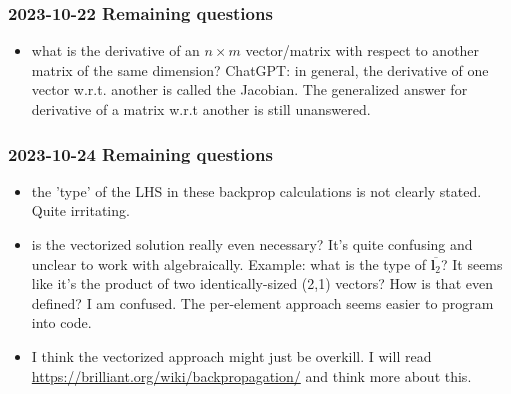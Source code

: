 \documentclass{article}
\begin{document}
\subsubsection{2023-10-22 Remaining questions}
\begin{itemize}
    \item what is the derivative of an $n \times m$ vector/matrix with respect to another matrix of the same dimension? 
    ChatGPT: in general, the derivative of one vector w.r.t. another is called the Jacobian.
    The generalized answer for derivative of a matrix w.r.t another is still unanswered.
\end{itemize}
\subsubsection{2023-10-24 Remaining questions}
\begin{itemize}
    \item the 'type' of the LHS in these backprop calculations is not clearly stated. Quite irritating.
    \item is the vectorized solution really even necessary? It's quite confusing and unclear to work with algebraically. 
    Example: what is the type of $\overline{\bm{l}_2}$? It seems like it's the product of two identically-sized (2,1) vectors? How is that even defined? I am confused. The per-element approach seems easier to program into code.
    \item I think the vectorized approach might just be overkill. I will read \url{https://brilliant.org/wiki/backpropagation/} and think more about this.
\end{itemize}
\end{document}
